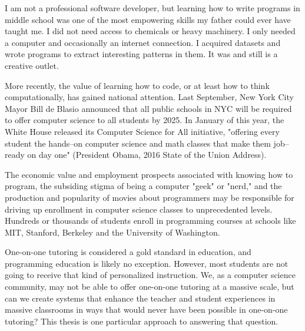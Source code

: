 I am not a professional software developer, but learning how to write programs in middle school was one of the most empowering skills my father could ever have taught me. I did not need access to chemicals or heavy machinery. I only needed a computer and occasionally an internet connection. I acquired datasets and wrote programs to extract interesting patterns in them. It was and still is a creative outlet.

More recently, the value of learning how to code, or at least how to think computationally, has gained national attention. Last September, New York City Mayor Bill de Blasio announced that all public schools in NYC will be required to offer computer science to all students by 2025. In January of this year, the White House released its Computer Science for All initiative, "offering every student the hands--on computer science and math classes that make them job--ready on day one" (President Obama, 2016 State of the Union Address).

The economic value and employment prospects associated with knowing how to program, the subsiding stigma of being a computer "geek" or "nerd," and the production and popularity of movies about programmers may be responsible for driving up enrollment in computer science classes to unprecedented levels. Hundreds or thousands of students enroll in programming courses at schools like MIT, Stanford, Berkeley and the University of Washington.

One-on-one tutoring is considered a gold standard in education, and programming education is likely no exception. However, most students are not going to receive that kind of personalized instruction. We, as a computer science community, may not be able to offer one-on-one tutoring at a massive scale, but can we create systems that enhance the teacher and student experiences in massive classrooms in ways that would never have been possible in one-on-one tutoring? This thesis is one particular approach to answering that question. %

